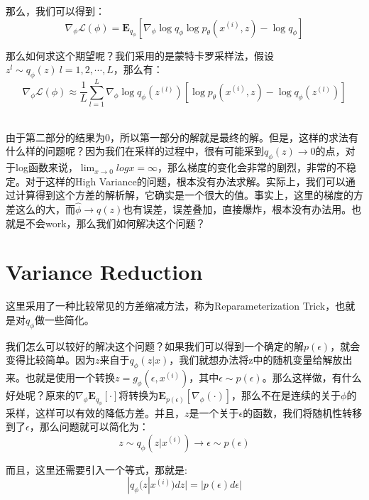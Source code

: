 \documentclass[a4paper]{article}
\begin{document}
那么，我们可以得到：
\begin{equation}
    \nabla_{\phi} \mathcal{L}(\phi) = \mathbf{E}_{q_{\phi}} \left[ \nabla_{\phi}\log q_{\phi} \log p_{\theta}(x^{(i)},z) - \log q_{\phi} \right] 
\end{equation}

那么如何求这个期望呢？我们采用的是蒙特卡罗采样法，假设$z^l \sim q_{\phi} (z)\ l = 1, 2, \cdots, L$，那么有：
\begin{equation}
    \nabla_{\phi} \mathcal{L}(\phi) \approx \frac{1}{L} \sum_{l=1}^L \nabla_{\phi}\log q_{\phi}(z^{(l)})\left[ \log p_{\theta}(x^{(i)},z) - \log q_{\phi}(z^{(l)})\right]
\end{equation}

~\\

由于第二部分的结果为0，所以第一部分的解就是最终的解。但是，这样的求法有什么样的问题呢？因为我们在采样的过程中，很有可能采到$q_{\phi}(z) \longrightarrow 0$的点，对于log函数来说，$\lim_{x\longrightarrow 0}log x = \infty$，那么梯度的变化会非常的剧烈，非常的不稳定。对于这样的High Variance的问题，根本没有办法求解。实际上，我们可以通过计算得到这个方差的解析解，它确实是一个很大的值。事实上，这里的梯度的方差这么的大，而$\hat{\phi} \longrightarrow q(z)$也有误差，误差叠加，直接爆炸，根本没有办法用。也就是不会work，那么我们如何解决这个问题？

\section{Variance Reduction}
这里采用了一种比较常见的方差缩减方法，称为Reparameterization Trick，也就是对$q_{\phi}$做一些简化。

我们怎么可以较好的解决这个问题？如果我们可以得到一个确定的解$p(\epsilon)$，就会变得比较简单。因为$z$来自于$q_{\phi}(z|x)$，我们就想办法将z中的随机变量给解放出来。也就是使用一个转换$z = g_{\phi}(\epsilon, x^{(i)})$，其中$\epsilon \sim p(\epsilon)$。那么这样做，有什么好处呢？原来的$\nabla_{\phi} \mathbf{E}_{q_{\phi}}[\cdot]$将转换为$ \mathbf{E}_{p(\epsilon)}[\nabla_{\phi}(\cdot)]$，那么不在是连续的关于$\phi$的采样，这样可以有效的降低方差。并且，$z$是一个关于$\epsilon$的函数，我们将随机性转移到了$\epsilon$，那么问题就可以简化为：
\begin{equation}
    z \sim q_{\phi}(z|x^{(i)}) \longrightarrow \epsilon \sim p(\epsilon)
\end{equation}

而且，这里还需要引入一个等式，那就是:
\begin{equation}
    |q_{\phi}(z|x^{(i)})dz| = |p(\epsilon)d\epsilon|
\end{equation}
\end{document}
